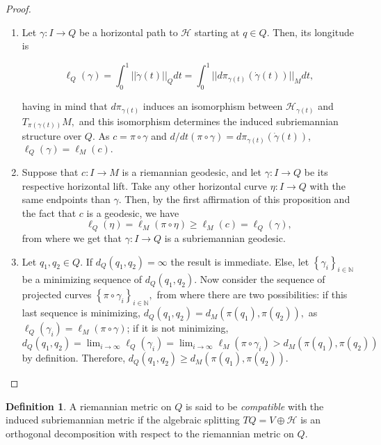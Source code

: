 \documentclass[12pt, letterpaper, reqno]{amsart}
\theoremstyle{definition}
\newtheorem{df}{Definition}
\theoremstyle{plain}
\theoremstyle{remark}
\begin{document}
\begin{proof}
	\begin{enumerate}
		\item Let $ \gamma: I \rightarrow {Q} $ be a horizontal path to $ \mathcal{H} $ starting at $ q\in Q. $ Then, its longitude is 

		$$\ell_Q(\gamma) = \int_0^1 ||\dot{\gamma} (t) ||_{Q} dt = \int_0^1 || d\pi_{\gamma(t)}(\dot{\gamma}(t))||_M dt,$$ 

		having in mind that $d\pi_{\gamma(t)}$ induces an isomorphism between $ \mathcal{H}_{\gamma(t)} $ and $ T_{\pi(\gamma(t))} M,$ and this isomorphism determines the induced subriemannian structure over $ Q. $ As $c=\pi\circ\gamma$ and $ d/dt(\pi\circ\gamma) = d\pi_{\gamma(t)}(\dot{\gamma}(t)) $, $ \ell_Q(\gamma)=\ell_M(c). $  

		\item Suppose that $ c: I \rightarrow {M} $ is a riemannian geodesic, and let $ \gamma: I \rightarrow {Q} $ be its respective horizontal lift. Take any other horizontal curve $ \eta: I \rightarrow {Q} $ with the same endpoints than $ \gamma. $ Then, by the first affirmation of this proposition and the fact that $ c $ is a geodesic, we have
			$$ \ell_Q(\eta) = \ell_M(\pi\circ \eta) \geq \ell_M(c) = \ell_Q(\gamma),  $$ 
		from where we get that $ \gamma: I \rightarrow {Q} $ is a subriemannian geodesic.

	\item Let $ q_1,q_2\in Q. $ If $ d_Q(q_1,q_2) = \infty $ the result is immediate. Else, let $ \left\{ \gamma_i \right\}_{i\in \mathbb{N}} $ be a minimizing sequence of $ d_Q(q_1,q_2). $ Now consider the sequence of projected curves $ \left\{ \pi\circ\gamma_i \right\}_{i\in \mathbb{N}}, $ from where there are two possibilities: if this last sequence is minimizing, $ d_Q(q_1, q_2) = d_M(\pi(q_1), \pi(q_2)),$ as $ \ell_Q(\gamma_i)=\ell_M(\pi\circ\gamma) $;  if it is not minimizing,  $d_Q(q_1,q_2) = \lim_{i \rightarrow \infty} \ell_Q(\gamma_i) = \lim_{i \rightarrow \infty} \ell_M(\pi\circ\gamma_i) > d_M(\pi(q_1),\pi(q_2))$ by definition. Therefore, $ d_Q(q_1,q_2)\geq d_M(\pi(q_1),\pi(q_2)).$
	\end{enumerate}
\end{proof}

\begin{df}\label{df:compatible}
	A riemannian metric on $ Q $ is said to be \textit{compatible} with the induced subriemannian metric if the algebraic splitting $ TQ = V \oplus \mathcal{H} $ is an orthogonal decomposition with respect to the riemannian metric on $ Q$.  
\end{df}
\end{document}
